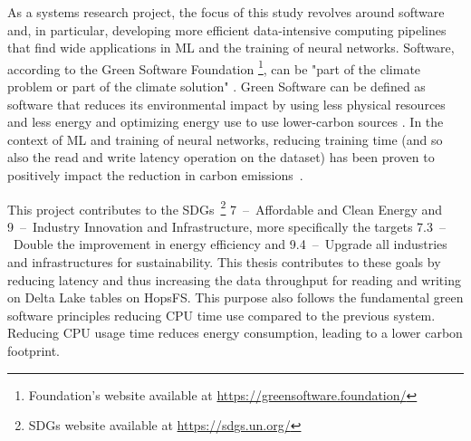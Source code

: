 As a systems research project, the focus of this study revolves around software and, in particular, developing more efficient data-intensive computing pipelines that find wide applications in \gls{ML} and the training of neural networks. Software, according to the Green Software Foundation \footnote{Foundation's website available at \url{https://greensoftware.foundation/}}, can be "part of the climate problem or part of the climate solution" \cite{WhatGreenSoftware2021}. Green Software can be defined as software that reduces its environmental impact by using less physical resources and less energy and optimizing energy use to use lower-carbon sources \cite{WhatGreenSoftware2021}. In the context of \gls{ML} and training of neural networks, reducing training time (and so also the read and write latency operation on the dataset) has been proven to positively impact the reduction in carbon emissions~\cite{pattersonCarbonEmissionsLarge2021,pattersonCarbonFootprintMachine2022}.

This project contributes to the \glspl{SDG}~\footnote{\glspl{SDG} website available at \url{https://sdgs.un.org/}} 7~--~Affordable and Clean Energy and 9~--~Industry Innovation and Infrastructure, more specifically the targets 7.3~--~Double the improvement in energy efficiency and 9.4~--~Upgrade all industries and infrastructures for sustainability. This thesis contributes to these goals by reducing latency and thus increasing the data throughput for reading and writing on Delta Lake tables on \gls{HopsFS}. This purpose also follows the fundamental green software principles reducing \gls{CPU} time use compared to the previous system. Reducing \gls{CPU} usage time reduces energy consumption, leading to a lower carbon footprint.

